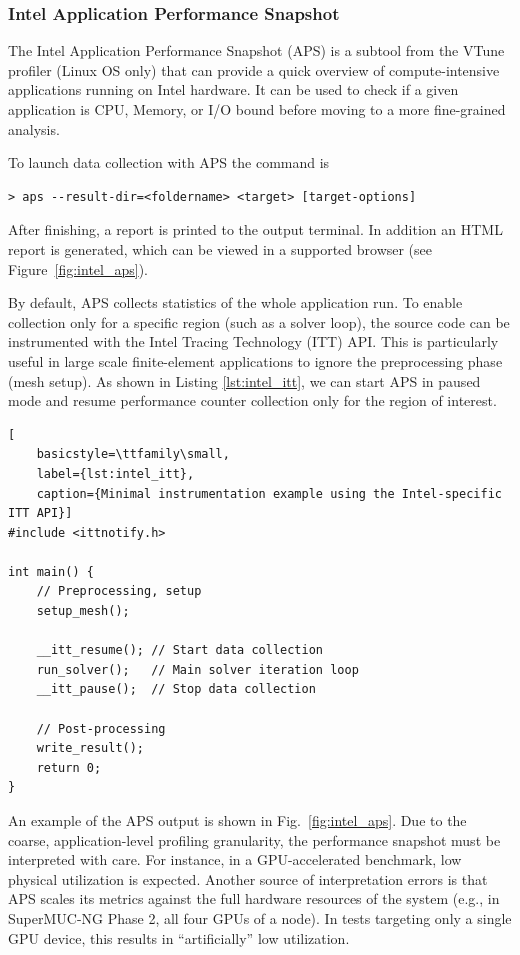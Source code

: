 \documentclass[a4paper,12pt]{article}
\begin{document}
\subsubsection{Intel Application Performance Snapshot}

The Intel Application Performance Snapshot (APS) is a subtool from the VTune profiler
(Linux OS only)
that can provide a quick overview of compute-intensive applications running
on Intel hardware.
It can be used to check if a given application is CPU, Memory, or I/O bound
before moving to a more fine-grained analysis.

To launch data collection with APS the command is
\begin{verbatim}
> aps --result-dir=<foldername> <target> [target-options]
\end{verbatim}
After finishing, a report is printed to the output terminal.
In addition an HTML report is generated, which can be viewed in a
supported browser (see Figure~\ref{fig:intel_aps}).

By default, APS collects statistics of the whole application run.
To enable collection only for a specific region (such as a solver loop),
the source code can be instrumented
with the Intel Tracing Technology (ITT) API.
This is particularly useful in large scale finite-element applications to
ignore the preprocessing phase (mesh setup).
As shown in Listing \ref{lst:intel_itt}, we can start APS in paused mode and resume
performance counter collection only for the region of interest.

\begin{lstlisting}[
    basicstyle=\ttfamily\small,
    label={lst:intel_itt},
    caption={Minimal instrumentation example using the Intel-specific ITT API}]
#include <ittnotify.h>

int main() {
    // Preprocessing, setup
    setup_mesh();

    __itt_resume(); // Start data collection
    run_solver();   // Main solver iteration loop
    __itt_pause();  // Stop data collection

    // Post-processing
    write_result();
    return 0;
}
\end{lstlisting}

An example of the APS output is shown in Fig.~\ref{fig:intel_aps}.
Due to the coarse, application-level profiling granularity, the performance
snapshot must be interpreted with care.
For instance, in a GPU-accelerated benchmark, low physical utilization is expected.
Another source of interpretation errors is that APS scales its metrics against the
full hardware resources of the system (e.g., in SuperMUC-NG Phase 2, all four GPUs of a node).
In tests targeting only a single GPU device, this results in ``artificially'' low
utilization.
\end{document}
